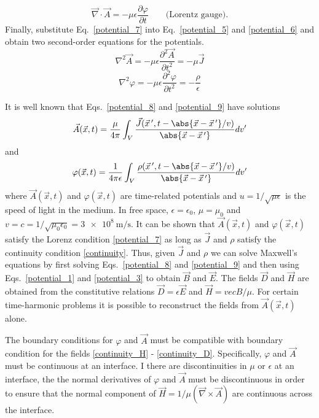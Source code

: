 \documentclass[12pt,a4paper,oneside]{book}
\begin{document}
\begin{onehalfspace}
\begin{equation}
\boxed{	\vec{\nabla}\cdot\vec{A}= -\mu\epsilon\frac{\partial\varphi}{\partial t}\qquad\text{(Lorentz gauge).}}
\end{equation}
Finally, substitute Eq.~\eqref{potential_7} into Eq.~\eqref{potential_5} and \ref{potential_6} and obtain two second-order equations for the potentials.
\begin{equation}\label{potential_8}
	\nabla^2\vec{A}= -\mu\epsilon\frac{\partial^2\vec{A}}{\partial t^2} = -\mu\vec{J}
\end{equation}
\begin{equation}\label{potential_9}
	\nabla^2\varphi= -\mu\epsilon\frac{\partial^2\varphi}{\partial t^2} = -\frac{\rho}{\epsilon}
\end{equation}

It is well known that Eqs.~\eqref{potential_8} and \ref{potential_9} have solutions
\begin{equation}\label{potential_10}
	\vec{A}(\vec{x},t)=\frac{\mu}{4\pi}\int_{V}\frac{\vec{J}(\vec{x}\,',t-\abs{\vec{x}-\vec{x}\,'}/v)}{\abs{\vec{x}- \vec{x}\,'}}dv'
\end{equation}
and
\begin{equation}\label{potential_11}
	{\varphi}(\vec{x},t)=\frac{1}{4\pi\epsilon}\int_{V}\frac{\rho(\vec{x}\,',t-\abs{\vec{x}-\vec{x}\,'}/v)}{\abs{\vec{x}- \vec{x}\,'}}dv'
\end{equation}
where $\vec{A}(\vec{x},t)$ and $\varphi(\vec{x},t)$ are time-related potentials and $u=1/\sqrt{\mu\epsilon}$ is the speed of light in the medium. In free space, $\epsilon=\epsilon_0$, $\mu=\mu_0$ and $v=c=1/\sqrt{\mu_0\epsilon_0}=\SI{3e8}{\meter\per\second}$. It can be shown that $\vec{A}(\vec{x},t)$ and $\varphi(\vec{x},t)$ satisfy the Lorenz condition \ref{potential_7} as long as $\vec{J}$ and $\rho$ satisfy the continuity condition \ref{continuity}. Thus, given $\vec{J}$ and $\rho$ we can solve Maxwell's equations by first solving Eqs.~\eqref{potential_8} and \ref{potential_9} and then using Eqs.~\eqref{potential_1} and \ref{potential_3} to obtain $\vec{B}$ and $\vec{E}$. The fields $\vec{D}$ and $\vec{H}$ are obtained from the constitutive relations $\vec{D}=\epsilon\vec{E}$ and $\vec{H}=vec{B}/\mu$. For certain time-harmonic problems it is possible to reconstruct the fields from $\vec{A}(\vec{x},t)$ alone.

The boundary conditions for $\varphi$ and $\vec{A}$ must be compatible with boundary condition for the fields \ref{continuity_H} - \ref{continuity_D}. Specifically, $\varphi$ and $\vec{A}$ must be continuous at an interface. I there are discontinuities in $\mu$ or $\epsilon$ at an interface, the the normal derivatives of $\varphi$ and $\vec{A}$ must be discontinuous in order to ensure that the normal component of $\vec{H}=1/\mu(\vec{\nabla}\times\vec{A})$ are continuous across the interface.


\end{onehalfspace}
\end{document}
